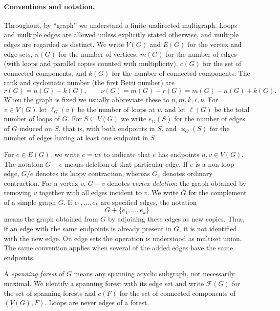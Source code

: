\documentclass[11pt]{article}
\theoremstyle{plain}
\theoremstyle{definition}
\renewcommand{\mathcal}{\mathscr}
\newcommand{\cF}{\mathcal{F}}    %
\newcommand{\kp}{\varkappa}
\numberwithin{equation}{section}
\begin{document}
\paragraph{Conventions and notation.}
Throughout, by ``graph'' we understand a finite undirected multigraph.
Loops and multiple edges are allowed unless explicitly stated otherwise, and multiple edges are regarded as distinct.
We write $V(G)$ and $E(G)$ for the vertex and edge sets, $n(G)$ for the number of vertices,
$m(G)$ for the number of edges (with loops and parallel copies counted with multiplicity),
$c(G)$ for the set of connected components, and $k(G)$ for the number of connected components.
The rank and cyclomatic number (the first Betti number) are
\[
   r(G)=n(G)-k(G), \qquad \nu(G)=m(G)-r(G)=m(G)-n(G)+k(G).
\]
When the graph is fixed we usually abbreviate these to $n, m, k, r, \nu$.
For $v\in V(G)$ let $\ell_G(v)$ be the number of loops at $v$, and let $\ell(G)$
be the total number of loops of $G$.  For $S\subseteq V(G)$ we write $e_G(S)$ for
the number of edges of $G$ induced on $S$, that is, with both endpoints in $S$,
and $\kp_G(S)$ for the number of edges having at least one endpoint in $S$.

For $e\in E(G)$, we write $e=uv$ to indicate that $e$ has endpoints $u,v\in V(G)$.
The notation $G-e$ means deletion of that particular edge. If $e$ is a non-loop edge,
$G/e$ denotes its loopy contraction, whereas $G_e$ denotes ordinary contraction.
For a vertex $v$, $G-v$ denotes \emph{vertex deletion}: the graph obtained by removing $v$
together with all edges incident to $v$.  We write $\overline G$ for the complement of a simple graph $G$.
If $e_1,\ldots,e_k$ are specified edges, the notation
\[
   G+\{e_1,\ldots,e_k\}
\]
means the graph obtained from $G$ by adjoining these edges as new copies.
Thus, if an edge with the same endpoints is already present in $G$, it is not identified with the new edge.
On edge sets the operation is understood as multiset union.  The same convention applies
when several of the added edges have the same endpoints.

A \emph{spanning forest} of $G$ means any spanning acyclic subgraph, not necessarily maximal.
We identify a spanning forest with its edge set and write $\cF(G)$ for the set of spanning
forests and $c(F)$ for the set of connected components of $(V(G),F)$.  Loops are never edges of a forest.
\end{document}
